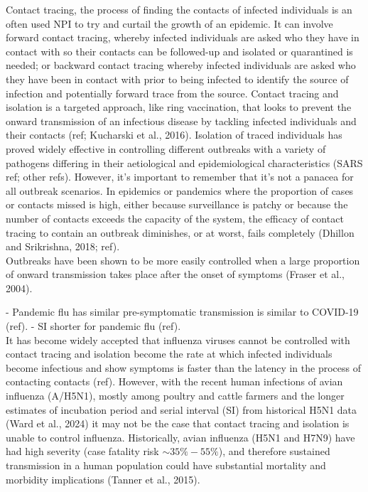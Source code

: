 \documentclass{article}
\begin{document}
Contact tracing, the process of finding the contacts of infected individuals is an often used NPI to try and curtail the growth of an epidemic. It can involve forward contact tracing, whereby infected individuals are asked who they have in contact with so their contacts can be followed-up and isolated or quarantined is needed; or backward contact tracing whereby infected individuals are asked who they have been in contact with prior to being infected to identify the source of infection and potentially forward trace from the source. Contact tracing and isolation is a targeted approach, like ring vaccination, that looks to prevent the onward transmission of an infectious disease by tackling infected individuals and their contacts (ref; Kucharski et al., 2016). Isolation of traced individuals has proved widely effective in controlling different outbreaks with a variety of pathogens differing in their aetiological and epidemiological characteristics (SARS ref; other refs). However, it's important to remember that it's not a panacea for all outbreak scenarios. In epidemics or pandemics where the proportion of cases or contacts missed is high, either because surveillance is patchy or because the number of contacts exceeds the capacity of the system, the efficacy of contact tracing to contain an outbreak diminishes, or at worst, fails completely (Dhillon and Srikrishna, 2018; ref). \\

Outbreaks have been shown to be more easily controlled when a large proportion of onward transmission takes place after the onset of symptoms (Fraser et al., 2004).

- Pandemic flu has similar pre-symptomatic transmission is similar to COVID-19 (ref).
- SI shorter for pandemic flu (ref). \\

It has become widely accepted that influenza viruses cannot be controlled with contact tracing and isolation become the rate at which infected individuals become infectious and show symptoms is faster than the latency in the process of contacting contacts (ref). However, with the recent human infections of avian influenza (A/H5N1), mostly among poultry and cattle farmers and the longer estimates of incubation period and serial interval (SI) from historical H5N1 data (Ward et al., 2024) it may not be the case that contact tracing and isolation is unable to control influenza. Historically, avian influenza (H5N1 and H7N9) have had high severity (case fatality risk $\sim 35\%-55\%$), and therefore sustained transmission in a human population could have substantial mortality and morbidity implications (Tanner et al., 2015). \\
\end{document}
